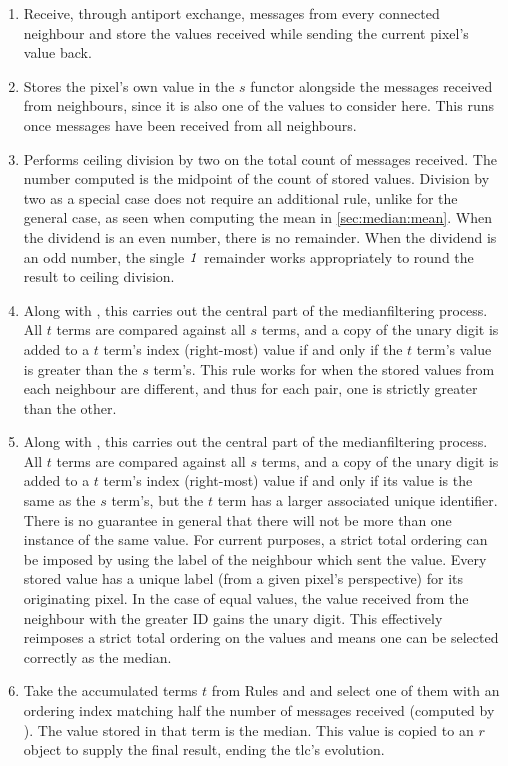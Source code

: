 \begin{enumerate}
    \item Receive, through antiport exchange, messages from every connected neighbour and store the values received while sending the current pixel's value back.
    \item Stores the pixel's own value in the \(s\) \gls{functor} alongside the messages received from neighbours, since it is also one of the values to consider here.  This runs once messages have been received from all neighbours.
    \item Performs ceiling division by two on the total count of messages received.  The number computed is the midpoint of the count of stored values.  Division by two as a special case does not require an additional rule, unlike for the general case, as seen when computing the mean in \vref{sec:median:mean}.  When the dividend is an even number, there is no remainder.  When the dividend is an odd number, the single \(\mathit{1}\) remainder works appropriately to round the result to ceiling division.
    \item Along with , this carries out the central part of the \gls{medianfilter}ing process.  All \(t\) terms are compared against all \(s\) terms, and a copy of the unary digit is added to a \(t\) term's index (right-most) value if and only if the \(t\) term's value is greater than the \(s\) term's.  This rule works for when the stored values from each neighbour are different, and thus for each pair, one is strictly greater than the other.
    \item Along with , this carries out the central part of the \gls{medianfilter}ing process.  All \(t\) terms are compared against all \(s\) terms, and a copy of the unary digit is added to a \(t\) term's index (right-most) value if and only if its value is the same as the \(s\) term's, but the \(t\) term has a larger associated unique identifier.  There is no guarantee in general that there will not be more than one instance of the same value.  For current purposes, a strict total ordering can be imposed by using the label of the neighbour which sent the value.  Every stored value has a unique label (from a given pixel's perspective) for its originating pixel.  In the case of equal values, the value received from the neighbour with the greater ID gains the unary digit.  This effectively reimposes a strict total ordering on the values and means one can be selected correctly as the median.
    \item Take the accumulated terms \(t\) from Rules  and  and select one of them with an ordering index matching half the number of messages received (computed by ).  The value stored in that term is the median.  This value is copied to an \(r\) object to supply the final result, ending the \gls{tlc}'s evolution.
\end{enumerate}


